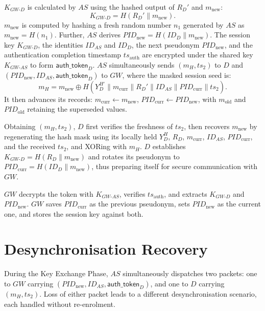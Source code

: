 \documentclass[12pt,a4paper]{report}
\begin{document}
$K_{GW\text{-}D}$ is calculated by $AS$ using the hashed output of $R_D'$ and
$m_{\mathrm{new}}$:
\begin{equation}
  K_{GW\text{-}D} = H(R_D' \| m_{\mathrm{new}}).
\end{equation}
$m_{\mathrm{new}}$ is computed by hashing a fresh random number $n_1$ generated by
$AS$ as $m_{\mathrm{new}} = H(n_1)$.
Further, $AS$ derives $\mathit{PID}_{\mathrm{new}} = H(ID_D \| m_{\mathrm{new}})$.
The session key $K_{GW\text{-}D}$, the identities $ID_{AS}$ and $ID_D$, the next
pseudonym $\mathit{PID}_{\mathrm{new}}$, and the authentication completion timestamp
$ts_{\mathrm{auth}}$ are encrypted under the shared key $K_{GW\text{-}AS}$ to form
$\mathsf{auth\_token}_D$.
$AS$ simultaneously sends $(m_H, ts_2)$ to $D$ and
$(\mathit{PID}_{\mathrm{new}}, ID_{AS}, \mathsf{auth\_token}_D)$ to $GW$, where
the masked session seed is:
\begin{equation}
  m_H = m_{\mathrm{new}} \oplus H(Y_D^{H'} \| m_{\mathrm{curr}} \| R_D' \|
  ID_{AS} \| \mathit{PID}_{\mathrm{curr}} \| ts_2).
\end{equation}
It then advances its records:
$m_{\mathrm{curr}} \leftarrow m_{\mathrm{new}}$,
$\mathit{PID}_{\mathrm{curr}} \leftarrow \mathit{PID}_{\mathrm{new}}$,
with $m_{\mathrm{old}}$ and $\mathit{PID}_{\mathrm{old}}$ retaining the superseded
values.

Obtaining $(m_H, ts_2)$, $D$ first verifies the freshness of $ts_2$, then recovers
$m_{\mathrm{new}}$ by regenerating the hash mask using its locally held
$Y_D^H$, $R_D$, $m_{\mathrm{curr}}$, $ID_{AS}$, $\mathit{PID}_{\mathrm{curr}}$, and
the received $ts_2$, and XORing with $m_H$.
$D$ establishes $K_{GW\text{-}D} = H(R_D \| m_{\mathrm{new}})$ and rotates its
pseudonym to $\mathit{PID}_{\mathrm{curr}} = H(ID_D \| m_{\mathrm{new}})$, thus
preparing itself for secure communication with $GW$.

$GW$ decrypts the token with $K_{GW\text{-}AS}$, verifies $ts_{\mathrm{auth}}$, and
extracts $K_{GW\text{-}D}$ and $\mathit{PID}_{\mathrm{new}}$.
$GW$ saves $\mathit{PID}_{\mathrm{curr}}$ as the previous pseudonym, sets
$\mathit{PID}_{\mathrm{new}}$ as the current one, and stores the session key against
both.

\section{Desynchronisation Recovery}

During the Key Exchange Phase, $AS$ simultaneously dispatches two packets: one to
$GW$ carrying $(\mathit{PID}_{\mathrm{new}}, ID_{AS}, \mathsf{auth\_token}_D)$,
and one to $D$ carrying $(m_H, ts_2)$.
Loss of either packet leads to a different desynchronisation scenario, each handled
without re-enrolment.
\end{document}
